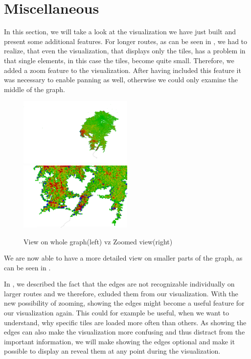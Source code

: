 \documentclass
[
    paper = a4,
    pagesize,
    12 pt,
    oneside,                       %
    open = right,
    DIV = calc,
    BCOR = 0 mm,                   %
    bibtotoc
]
{scrbook}
\begin{document}
\section{Miscellaneous}

In this section, we will take a look at the visualization we have just built and present some additional features.
For longer routes, as can be seen in , we had to realize, that even the visualization, that displays only the tiles, has a problem in that single elements, in this case the tiles, become quite small.
Therefore, we added a zoom feature to the visualization.
After having included this feature it was necessary to enable panning as well, otherwise we could only examine the middle of the graph.

\begin{figure}
    \includegraphics[width=0.5\textwidth]{Images/vis-zoom-small.png}
    \includegraphics[width=0.5\textwidth]{Images/vis-zoom-large.png}
\caption[]{View on whole graph(left) vz Zoomed view(right)}
\label{fig:zoom}
\end{figure}

We are now able to have a more detailed view on smaller parts of the graph, as can be seen in .

In , we described the fact that the edges are not recognizable individually on larger routes and we therefore, exluded them from our visualization.
With the new possibility of zooming, showing the edges might become a useful feature for our visualization again.
This could for example be useful, when we want to understand, why specific tiles are loaded more often than others.
As showing the edges can also make the visualization more confusing and thus distract from the important information, we will make showing the edges optional and make it possible to display an reveal them at any point during the visualization.
\end{document}
